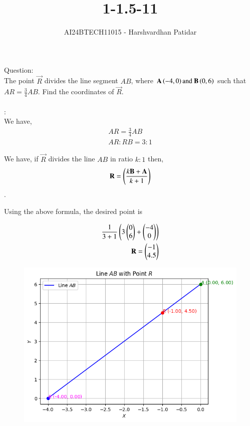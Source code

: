 \documentclass[journal]{IEEEtran}
\begin{document}

\vspace{3cm}

\title{1-1.5-11}
\author{AI24BTECH11015 - Harshvardhan Patidar}
{\let\newpage\relax\maketitle}

\renewcommand{\thefigure}{\theenumi}
\renewcommand{\thetable}{\theenumi}
\setlength{\intextsep}{10pt} %


\renewcommand{\thetable}{\theenumi}


	Question:\\
		The point $\vec{R}$ divides the line segment $AB$, where $\mathbf{A} \left(-4,0\right) \text{and } \mathbf{B} \left(0,6\right)$ such that $AR = \frac{3}{4}AB$. Find the coordinates of $\vec{R}$.
	\\
	\\
	\solution:\\

	We have,
	\begin{align}
		AR = \frac{3}{4} AB\\
		AR:RB = 3:1
	\end{align}

	We have, if $\vec{R}$ divides the line $AB$ in ratio $k:1$ then, $$\mathbf{R} = \left(\frac{k\mathbf{B} + \mathbf{A}}{k+1}\right)$$.

	Using the above formula, the desired point is

	\begin{align}
		\frac{1}{3+1}\left(3\begin{pmatrix}0\\6\end{pmatrix} + \begin{pmatrix}-4\\0\end{pmatrix}\right) \\
		\mathbf{R}=\begin{pmatrix}-1\\4.5\end{pmatrix}
	\end{align}


	\begin{figure}[hbt!]
		\centering
		\includegraphics[width=0.6\linewidth]{plots/plot.png}

	\end{figure}
\end{document}
